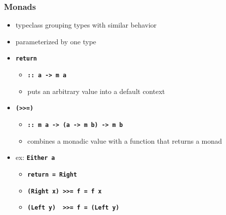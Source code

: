 \documentclass{beamer}
\newcommand{\lit}[1]{\textbf{\texttt{#1}}}
\begin{document}
\begin{frame}
  \frametitle{Monads}
  \begin{itemize}
  \pause\item typeclass grouping types with similar behavior
  \pause\item parameterized by one type
  \pause\item \lit{return}
  \begin{itemize}
  \item \lit{::\ a -> m a}
    \pause  \item puts an arbitrary value into a default context
  \end{itemize}
  \pause\item \lit{(>>=)}
  \begin{itemize}
  \item \lit{::\ m a -> (a -> m b) -> m b}
    \pause\item combines a monadic value with a function that returns a monad
  \end{itemize}
  \pause\item ex: \lit{Either a}
  \begin{itemize}
    \pause\item \lit{return = Right}
    \pause\item \lit{(Right x) >>= f = f x}
    \item \lit{(Left y) \ >>= f = (Left y)}
  \end{itemize}
  \end{itemize}
\end{frame}
\end{document}
